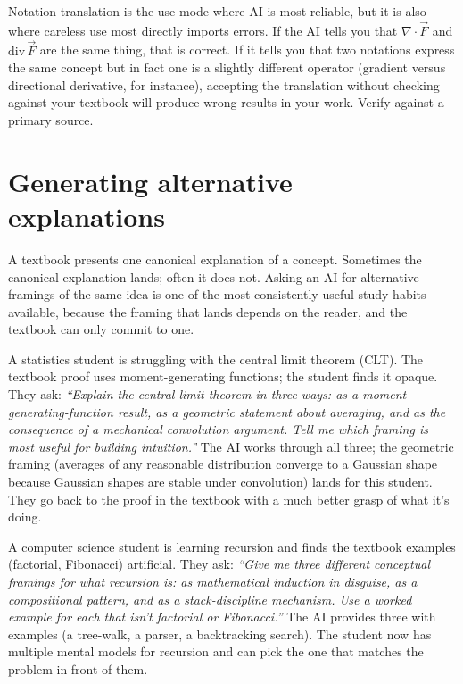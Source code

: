 \documentclass[11pt]{book}
\begin{document}
\begin{watchout}
Notation translation is the use mode where AI is most reliable, but it is also where careless use most directly imports errors. If the AI tells you that $\nabla \cdot \vec{F}$ and $\text{div}\,\vec{F}$ are the same thing, that is correct. If it tells you that two notations express the same concept but in fact one is a slightly different operator (gradient versus directional derivative, for instance), accepting the translation without checking against your textbook will produce wrong results in your work. Verify against a primary source.
\end{watchout}

\section{Generating alternative explanations}

A textbook presents one canonical explanation of a concept. Sometimes the canonical explanation lands; often it does not. Asking an AI for alternative framings of the same idea is one of the most consistently useful study habits available, because the framing that lands depends on the reader, and the textbook can only commit to one.

\begin{example}
A statistics student is struggling with the central limit theorem (CLT). The textbook proof uses moment-generating functions; the student finds it opaque. They ask: \emph{``Explain the central limit theorem in three ways: as a moment-generating-function result, as a geometric statement about averaging, and as the consequence of a mechanical convolution argument. Tell me which framing is most useful for building intuition.''} The AI works through all three; the geometric framing (averages of any reasonable distribution converge to a Gaussian shape because Gaussian shapes are stable under convolution) lands for this student. They go back to the proof in the textbook with a much better grasp of what it's doing.
\end{example}

\begin{example}
A computer science student is learning recursion and finds the textbook examples (factorial, Fibonacci) artificial. They ask: \emph{``Give me three different conceptual framings for what recursion is: as mathematical induction in disguise, as a compositional pattern, and as a stack-discipline mechanism. Use a worked example for each that isn't factorial or Fibonacci.''} The AI provides three with examples (a tree-walk, a parser, a backtracking search). The student now has multiple mental models for recursion and can pick the one that matches the problem in front of them.
\end{example}
\end{document}
